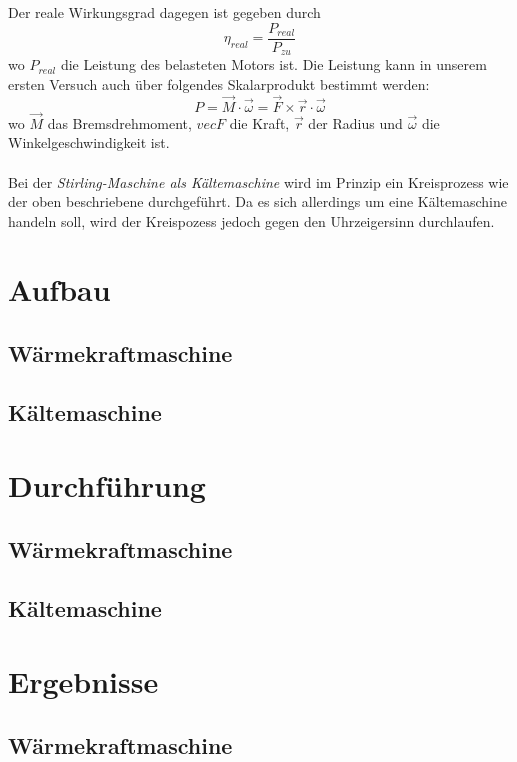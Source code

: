 \documentclass[12pt,a4paper,twopage]{article}
\begin{document}
Der reale Wirkungsgrad dagegen ist gegeben durch
$$\eta_{real}=\frac{P_{real}}{P_{zu}}$$
wo $P_{real}$ die Leistung des belasteten Motors ist. Die Leistung kann in unserem ersten Versuch auch über folgendes Skalarprodukt bestimmt werden:
$$P=\vec{M}\cdot\vec{\omega}=\vec{F}\times\vec{r}\cdot\vec{\omega}$$
wo $\vec{M}$ das Bremsdrehmoment, $vec{F}$ die Kraft, $\vec{r}$ der Radius und $\vec{\omega}$ die Winkelgeschwindigkeit ist.\\
\\
Bei der \textit{Stirling-Maschine als Kältemaschine} wird im Prinzip ein Kreisprozess wie der oben beschriebene durchgeführt. Da es sich allerdings um eine Kältemaschine handeln soll, wird der Kreispozess jedoch gegen den Uhrzeigersinn durchlaufen.

\section{Aufbau}
\subsection{Wärmekraftmaschine}
\subsection{Kältemaschine}

\section{Durchführung}

\subsection{Wärmekraftmaschine}
\subsection{Kältemaschine}

\section{Ergebnisse}
\subsection{Wärmekraftmaschine}
\end{document}
